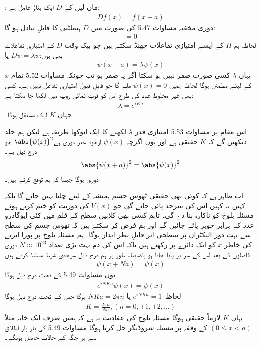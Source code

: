 : مان لیں کے $D$ ایک ہٹاؤ عامل ہے:
\begin{align}
	Df(x) = f(x+a)
\end{align}
دوری مخفیہ مساوات \num{5.47} کی صورت میں $D$ ہیملٹنی کا قابلِ تبادل ہو گا:
\begin{align}
	[D, H] = 0
\end{align}
لحاظہ ہم $H$ کے ایسے امتیازی تفاعلات چھنڈ سکتے ہیں جو بیک وقت $D$ کے امتیازی تفاعلات بھی ہوں:\(D\psi = \lambda\psi\) یا
\begin{align}
	\psi(x+a) = \lambda\psi(x)
\end{align}
یہاں $\lambda$ کسی صورت صفر نہیں ہو سکتا اگر یہ صفر ہو تب چونکہ مساوات \num{5.52} تمام $x$ کے لیئے مطمئن ہوگا لحاظہ ہمیں \(\psi(x) = 0\) ملے گا جو قابلِ قبول امتیازی تفاعل نہیں ہے۔ کسی بھی غیر مخلوط عدد کی طرح اس کو قوتِ نمائی روپ میں لکھا جا سکتا ہے: 
\begin{align}
	\lambda = e^{iKa}
\end{align}
جہاں $K$ ایک مستقل ہوگا۔

اس مقام پر مساوات \num{5.53} امتیازی قدر $\lambda$ لکھنے کا ایک انوکھا طریقہ ہے لیکن ہم جلد دیکھیں گے کہ $K$ حقیقی ہے اور یوں اگرچہ $\psi(x)$ ازخود غیر دوری ہے\(\abs{\psi(x)}^{2}\) جو درج ذیل ہے۔
\begin{align}
	\abs{\psi(x+a)}^{2} = \abs{\psi(x)}^{2}
\end{align}
دوری ہوگا جیسا کہ ہم توقع کرتے ہیں۔

اب ظاہر ہے کہ کوئی بھی حقیقی ٹھوس جسم ہمیشہ کے لیئے چلتا نہیں جائے گا بلکہ کہیں نہ کہیں اس کی سرحد پائی جائے گی جو $V(x)$ کی دوریت کو ختم کرتے ہوئے مسئلہ بلوخ کو ناکارہ بنا دے گی۔ تاہم کسی بھی کلابین سطح کے  قلم میں کئی ایوگادرو عدد کے برابر جوہر پائے جائیں گے اور ہم فرض کر سکتے ہیں کہ تھوس جسم کی سطح سے بہت دور الیکٹران پر سطحی اثر قابلِ نظر انداز ہوگا۔ ہم مسئلہ بلوخ پر پورا اترنے کی خاطر $x$ کو ایک دائرے پر رکھتے ہیں تاکہ اس کی دم بہت بڑی تعداد \(N\approx10^{23}\) دوری فاصلوں کے بعد اس کے سر پر پایا جاتا ہو باضابطہ طور پر ہم درج ذیل سرحدی شرط مسلط کرتے ہیں   
\begin{align}
	\psi(x+Na) = \psi(x)
\end{align}
یوں مساوات \num{5.49} کے تحت درج ذیل ہوگا
\begin{align*}
	e^{iNKa}\psi(x) = \psi(x)
\end{align*}
لحاظہ \(e^{iNKa} = 1\) یا \(NKa = 2\pi n\) ہوگا جس کے تحت درج ذیل ہوگا 
\begin{align}
	K = \frac{2\pi n}{Na}, (n = 0, \pm1, \pm2, \dots)
\end{align}
یہاں $K$ لازماً حقیقی ہوگا مسئلہ بلوخ کی عفادیت یہ ہے کہ ہمیں صرف ایک خانہ مثلاً \((0\leq x<a)\) کے وقفہ پر مسئلہ شروڈنگر حل کرنا ہوگا مساوات \num{5.49} کی بار بار اطلاق سے ہر جگہ کے حالات  حاصل ہوںگے۔


